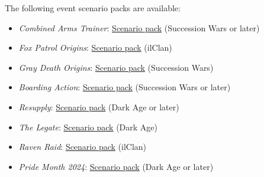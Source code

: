 The following event scenario packs are available:

\begin{itemize}

\item \emph{Combined Arms Trainer}: \href{https://raw.githubusercontent.com/Eudicods/outworlds-wastes/rules-pdf/combined-arms-trainer.pdf}{Scenario pack} (Succession Wars or later)

\item \emph{Fox Patrol Origins}: \href{https://raw.githubusercontent.com/Eudicods/outworlds-wastes/rules-pdf/fox-patrol-origins.pdf}{Scenario pack} (ilClan)

\item \emph{Gray Death Origins}: \href{https://raw.githubusercontent.com/Eudicods/outworlds-wastes/rules-pdf/gray-death-origins.pdf}{Scenario pack} (Succession Wars)

\item \emph{Boarding Action}: \href{https://raw.githubusercontent.com/Eudicods/outworlds-wastes/rules-pdf/boarding-action.pdf}{Scenario pack} (Succession Wars or later)

\item \emph{Resupply}: \href{https://raw.githubusercontent.com/Eudicods/outworlds-wastes/rules-pdf/resupply.pdf}{Scenario pack} (Dark Age or later)

\item \emph{The Legate}: \href{https://raw.githubusercontent.com/Eudicods/outworlds-wastes/rules-pdf/the-legate.pdf}{Scenario pack} (Dark Age)

\item \emph{Raven Raid}: \href{https://raw.githubusercontent.com/Eudicods/outworlds-wastes/rules-pdf/raven-raid.pdf}{Scenario pack} (ilClan)

\item \emph{Pride Month 2024}: \href{https://raw.githubusercontent.com/Eudicods/outworlds-wastes/rules-pdf/pride-2024.pdf}{Scenario pack} (Dark Age or later)

\end{itemize}
